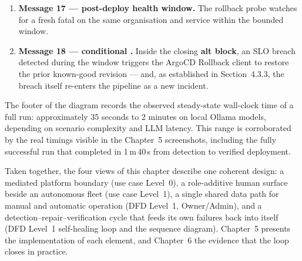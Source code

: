 \begin{enumerate}[itemsep=2pt]
        automatic rebuild and redeploy of the preview container.
  \item \textbf{Message 17 --- post-deploy health window.} The rollback
        probe watches  for a fresh fatal on the same
        organisation and service within the bounded window.
  \item \textbf{Message 18 --- conditional .} Inside
        the closing \textbf{alt block}, an SLO breach detected during the
        window triggers the ArgoCD Rollback client to restore the prior
        known-good revision --- and, as established in
        Section~4.3.3, the breach itself re-enters the pipeline as a new
        incident.
\end{enumerate}

The footer of the diagram records the observed steady-state wall-clock time
of a full run: approximately 35 seconds to 2 minutes on local Ollama models,
depending on scenario complexity and LLM latency. This range is corroborated
by the real timings visible in the Chapter~5 screenshots, including the
fully successful run that completed in 1\,m\,40\,s from detection to
verified deployment.

Taken together, the four views of this chapter describe one coherent design:
a mediated platform boundary (use case Level~0), a role-additive human
surface beside an autonomous fleet (use case Level~1), a single shared data
path for manual and automatic operation (DFD Level~1, Owner/Admin), and a
detection--repair--verification cycle that feeds its own failures back into
itself (DFD Level~1 self-healing loop and the sequence diagram). Chapter~5
presents the implementation of each element, and Chapter~6 the evidence that
the loop closes in practice.
